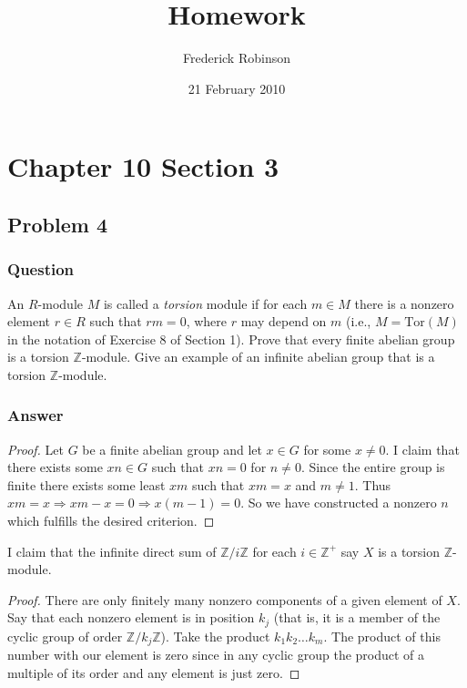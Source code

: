 \documentclass[12pt]{article}
\title{Homework}
\author{Frederick Robinson}
\date{21 February 2010}
\begin{document}

   \maketitle

\setcounter{tocdepth}{2} 

\tableofcontents

\section{Chapter 10 Section 3}
\subsection{Problem 4}
\subsubsection{Question}
An $R$-module $M$ is called a \emph{torsion} module if for each $m \in M$ there is a nonzero element $r \in R$ such that $r m =0$, where $r$ may depend on $m$ (i.e., $M = \mathrm{Tor}(M)$ in the notation of Exercise 8 of Section 1). Prove that every finite abelian group is a torsion $\mathbb{Z}$-module. Give an example of an infinite abelian group that is a torsion $\mathbb{Z}$-module.
\subsubsection{Answer}
\begin{proof}
Let $G$ be a finite abelian group and let $x \in G$ for some $x \neq 0$. I claim that there exists some $x n \in G$ such that $x n= 0$ for $n \neq 0$. Since the entire group is finite there exists some least $x m$ such that $x m=x$ and $m\neq 1$. Thus $ x m = x \Rightarrow xm-x = 0 \Rightarrow x(m-1)=0$. So we have constructed a nonzero $n$ which fulfills the desired criterion. 
\end{proof}

I claim that the infinite direct sum of $\mathbb{Z}/i \mathbb{Z}$ for each $i \in \mathbb{Z}^+$ say $X$ is a torsion $\mathbb{Z}$-module.
\begin{proof}\label{done}
There are only finitely many nonzero components of a given element of $X$. Say that each nonzero element is in position $k_j$ (that is, it is a member of the cyclic group of order $\mathbb{Z}/k_j\mathbb{Z}$). Take the product $k_1k_2\dots k_m$. The product of this number with our element is zero since in any cyclic group the product of a multiple of its order and any element is just zero.
\end{proof} 
\end{document}
